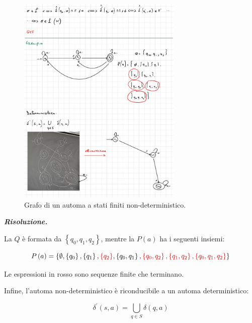 \documentclass[a4paper]{article}
\begin{document}
	\begin{figure}[!htp]
		\centering
		\includegraphics[width=0.7\textwidth]{img/grafo_ex2.pdf}
		\caption{Grafo di un automa a stati finiti non-deterministico.}
	\end{figure}
	
	\noindent
	\textcolor{Green4}{\textbf{\emph{Risoluzione.}}}
	
	\noindent
	La $Q$ è formata da $\left\{q_{0}, q_{1}, q_{2}\right\}$, mentre la $P(a)$ ha i seguenti insiemi:
	
	\begin{equation*}
		P\left(a\right) = \left\{
		\emptyset, \left\{q_{0}\right\},
		\left\{q_{1}\right\},
		\textcolor{Red3}{\left\{q_{2}\right\}}, \left\{q_{0}, q_{1}\right\},
		\textcolor{Red3}{\left\{q_{0}, q_{2}\right\}, \left\{q_{1}, q_{2}\right\},
		\left\{q_{0}, q_{1}, q_{2}\right\}}\right\}
	\end{equation*}

	\noindent
	Le espressioni in rosso sono sequenze finite che terminano.
	
	\noindent
	Infine, l'automa non-deterministico è riconducibile a un automa deterministico:
	
	\begin{equation*}
		\delta^{'} \left(s, a\right) = \bigcup_{q \in S} \delta \left(q, a\right)
	\end{equation*}
\end{document}
